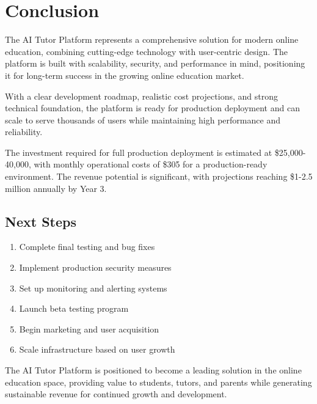 \documentclass[11pt,a4paper]{article}
\begin{document}
\section{Conclusion}

The AI Tutor Platform represents a comprehensive solution for modern online education, combining cutting-edge technology with user-centric design. The platform is built with scalability, security, and performance in mind, positioning it for long-term success in the growing online education market.

With a clear development roadmap, realistic cost projections, and strong technical foundation, the platform is ready for production deployment and can scale to serve thousands of users while maintaining high performance and reliability.

The investment required for full production deployment is estimated at \$25,000-40,000, with monthly operational costs of \$305 for a production-ready environment. The revenue potential is significant, with projections reaching \$1-2.5 million annually by Year 3.

\subsection{Next Steps}
\begin{enumerate}
    \item Complete final testing and bug fixes
    \item Implement production security measures
    \item Set up monitoring and alerting systems
    \item Launch beta testing program
    \item Begin marketing and user acquisition
    \item Scale infrastructure based on user growth
\end{enumerate}

The AI Tutor Platform is positioned to become a leading solution in the online education space, providing value to students, tutors, and parents while generating sustainable revenue for continued growth and development.
\end{document}
